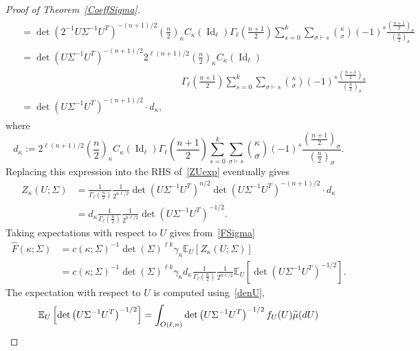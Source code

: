 \documentclass[AHL,Unicode,longabstracts,published]{cedram}
\DeclareMathOperator{\Id}{Id}
\newcommand{\EX}[2]{\mathbb{E}_{#1}\left[#2\right]}
\let\oldtilde\tilde
\renewcommand*{\tilde}[1]{\mathchoice{\widetilde{#1}}{\widetilde{#1}}{\oldtilde{#1}}{\oldtilde{#1}}}
\begin{document}
\begin{proof}[Proof of Theorem~\ref{CoeffSigma}]
\begin{multline*}
\begin{aligned}
&= \det\left(2^{-1}U\Sigma^{-1}U^T\right)^{-(n+1)/2}
\left(\frac{n}{2}\right)_{\kappa} C_{\kappa}(\Id_{\ell})
\Gamma_{\ell}\left(\frac{n+1}{2}\right)
\sum_{s=0}^{k} \sum_{\sigma \vdash s} \binom{\kappa}{\sigma} (-1)^s\frac{\left(\frac{n+1}{2}\right)_{\sigma}}{\left(\frac{n}{2}\right)_{\sigma}} \\
&=\det\left(U\Sigma^{-1}U^T\right)^{-(n+1)/2} 2^{\ell(n+1)/2}\left(\frac{n}{2}\right)_{\kappa} C_{\kappa}\left(\Id_{\ell}\right)\\
&\hspace{7cm}\Gamma_{\ell}\left(\frac{n+1}{2}\right)
\sum_{s=0}^{k} \sum_{\sigma \vdash s} \binom{\kappa}{\sigma} (-1)^s\frac{\left(\frac{n+1}{2}\right)_{\sigma}}{\left(\frac{n}{2}\right)_{\sigma}} \\
&= \det\left(U\Sigma^{-1}U^T\right)^{-(n+1)/2} \cdot d_{\kappa},
\end{aligned}
\end{multline*}
where
\begin{equation}\label{dk}
d_{\kappa}:= 2^{\ell(n+1)/2}\left(\frac{n}{2}\right)_{\kappa} C_{\kappa}(\Id_{\ell})
\Gamma_{\ell}\left(\frac{n+1}{2}\right)
\sum_{s=0}^{k} \sum_{\sigma \vdash s} \binom{\kappa}{\sigma} (-1)^s\frac{\left(\frac{n+1}{2}\right)_{\sigma}}{\left(\frac{n}{2}\right)_{\sigma}}.
\end{equation}
Replacing this expression into the RHS of~\eqref{ZUexp} eventually gives
\begin{align*}
Z_{\kappa}(U;\Sigma) &=\frac{1}{\Gamma_{\ell}\left(\frac{n}{2}\right)}
\frac{1}{2^{n\ell/2}} \det\left(U\Sigma^{-1}U^T\right)^{ n/2} \det\left(U\Sigma^{-1}U^T\right)^{-(n+1)/2} \cdot d_{\kappa} \\
&=d_{\kappa} \frac{1}{\Gamma_{\ell}\left(\frac{n}{2}\right)}
\frac{1}{2^{n\ell/2}} \det\left(U\Sigma^{-1}U^T\right)^{-1/2}.
\end{align*}
Taking expectations with respect to $U$ gives from~\eqref{FSigma}
\begin{align*}
\widehat{F}(\kappa;\Sigma) &= c(\kappa;\Sigma)^{-1} \det(\Sigma)^{\ell k} \gamma_{\kappa}
\EX{U}{Z_{\kappa}(U;\Sigma)} \\
&= c(\kappa;\Sigma)^{-1}
\det(\Sigma)^{\ell k} \gamma_{\kappa} d_{\kappa} \frac{1}{\Gamma_{\ell}\left(\frac{n}{2}\right)}
\frac{1}{2^{n\ell/2}} \EX{U}{\det\left(U\Sigma^{-1}U^T\right)^{-1/2}}.
\end{align*}
The expectation with respect to $U$ is computed using~\eqref{denU},
\begin{align*}
\EX{U}{\det\left(U\Sigma^{-1}U^T\right)^{-1/2}} &= \int_{O(\ell,n)} \det\left(U\Sigma^{-1}U^T\right)^{-1/2} f_U(U) \tilde{\mu}(dU) \\

\end{align*}
\end{proof}
\end{document}
